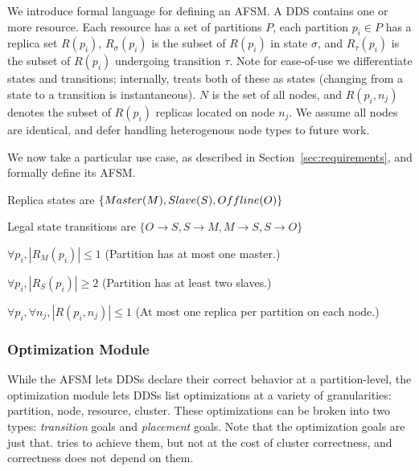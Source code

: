 We introduce formal language for defining an AFSM.
A DDS contains one or more resource. Each resource has a set of partitions $P$, each partition $p_i \in P$ has a replica
set $R(p_i)$, $R_\sigma(p_i)$ is the subset of $R(p_i)$ in state $\sigma$, and 
$R_\tau(p_i)$ is the subset of $R(p_i)$ undergoing transition $\tau$.  Note for
ease-of-use we differentiate states and transitions; internally, \helix treats both
of these as states (changing from a state to a transition is instantaneous).
$N$ is the set of all nodes, and $R(p_i, n_j)$ denotes the subset of $R(p_i)$
replicas located on
node $n_j$.  We assume all nodes are identical, and defer handling heterogenous
node types to future work.

We now take a particular use case, \ES as described in
Section~\ref{sec:requirements}, and formally define its AFSM.
\be
\item Replica states are $\{Master (M), Slave (S), \\ Offline(O)\}$
\item Legal state transitions are $\{O \rightarrow S, S \rightarrow M,
M \rightarrow S, S \rightarrow O\}$  
\item $\forall p_i, |R_M(p_i)| \le 1$  (Partition has at most one master.)
\item $\forall p_i, |R_S(p_i)| \ge 2$  (Partition has at least two slaves.)   
\item $\forall p_i, \forall n_j, |R(p_i, n_j)| \le 1$ (At most one replica per partition
on each node.)
\ee
{}%

\subsubsection{Optimization Module}
%
While the AFSM lets DDSs declare their correct behavior at a partition-level, the optimization module
lets DDSs list optimizations at a variety of granularities: partition, node,
resource, cluster.  These optimizations can be broken into two types:
\emph{transition} goals and \emph{placement} goals.
Note that the optimization goals are just that.  \helix tries to achieve them,
but not at the cost of cluster correctness, and correctness does not depend on
them. 

